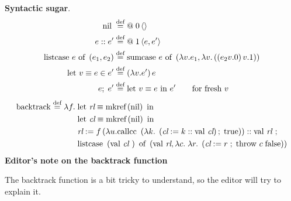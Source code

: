 \begin{enumcirc}
	\textbf{Syntactic sugar}.
	\begin{align*}
		\textrm{nil} \;                                             & \stackrel{\text{def}}{=} @ \; 0 \left\langle  \right\rangle                                                     \\
		e :: e'                                             & \stackrel{\text{def}}{=} @ \; 1 \left\langle e, e' \right\rangle                                                \\
		\textrm{listcase } e \textrm{ of } \left( e_1, e_2 \right) & \stackrel{\text{def}}{=}
		\textrm{sumcase } e \textrm{ of } \left( \lambda v. e_1, \lambda v. \left( \left( e_2 v.0 \right) v.1 \right) \right)                                    \\
		\textrm{let } v \equiv e \in e'                     & \stackrel{\text{def}}{=} \left( \lambda v . e' \right) e                                               \\
		e ;\; e'                                            & \stackrel{\text{def}}{=} \textrm{let } v \equiv e \textrm{ in } e' \qquad \textrm{for fresh } v \\
	\end{align*}
	\begin{align*}
		\textrm{backtrack} \stackrel{\text{def}}{=} \lambda f. \; & \textrm{let }\textit{rl} \equiv \textrm{mkref} \left( \textrm{nil} \right) \textrm{ in}                                                                                                                    \\
		                                        & \textrm{let }\textit{cl} \equiv \textrm{mkref} \left( \textrm{nil} \right) \textrm{ in}                                                                                                                    \\
		                                        & \textit{rl} := f\left( \lambda u. \textrm{callcc } \left( \lambda k. \; \left( \textit{cl} := k :: \textrm{val }\textit{cl} \right) ; \; \textrm{true} \right) \right) :: \textrm{val }\textit{rl } ;                            \\
		                                        & \textrm{listcase } \left( \textrm{val }\textit{cl } \right) \textrm{ of } \left( \textrm{val }\textit{rl}, \lambda c. \; \lambda r. \; \left( \textit{cl} := r \;;\; \textrm{throw } c \; \textrm{false} \right) \right) \\
	\end{align*}
	\textbf{Editor's note on the backtrack function}

	The backtrack function is a bit tricky to understand, so the editor will try to
	explain it.


\end{enumcirc}
